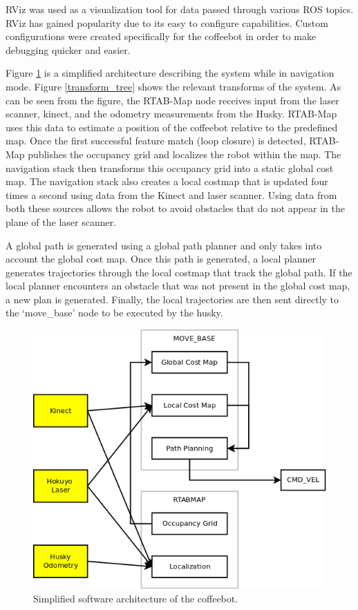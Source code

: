 \documentclass[letterpaper, 10 pt, conference]{ieeeconf}  %
\begin{document}
RViz was used as a visualization tool for data passed through various ROS topics. RViz has gained popularity due to its easy to configure capabilities. Custom configurations were created specifically for the coffeebot in order to make debugging quicker and easier.

Figure \ref{software_architecture} is a simplified architecture describing the system while in navigation mode. Figure \ref{transform_tree} shows the relevant transforms of the system. As can be seen from the figure, the RTAB-Map node receives input from the laser scanner, kinect, and the odometry measurements from the Husky. RTAB-Map uses this data to estimate a position of the coffeebot relative to the predefined map. Once the first successful feature match (loop closure) is detected, RTAB-Map publishes the occupancy grid and localizes the robot within the map.  The navigation stack then transforms this occupancy grid into a static global cost map. The navigation stack also creates a local costmap that is updated four times a second using data from the Kinect and laser scanner. Using data from both these sources allows the robot to avoid obstacles that do not appear in the plane of the laser scanner.

A global path is generated using a global path planner and only takes into account the global cost map. Once this path is generated, a local planner generates trajectories through the local costmap that track the global path. If the local planner encounters an obstacle that was not present in the global cost map, a new plan is generated. Finally, the local trajectories are then sent directly to the \enquote*{move\_base} node to be executed by the husky.

	\begin{figure}[!ht]
		\centering
		\includegraphics[width=1.0\columnwidth]{Figures/ROS_node_diagram}
		\caption{Simplified software architecture of the coffeebot.}
		\label{software_architecture}
	\end{figure}
\end{document}
